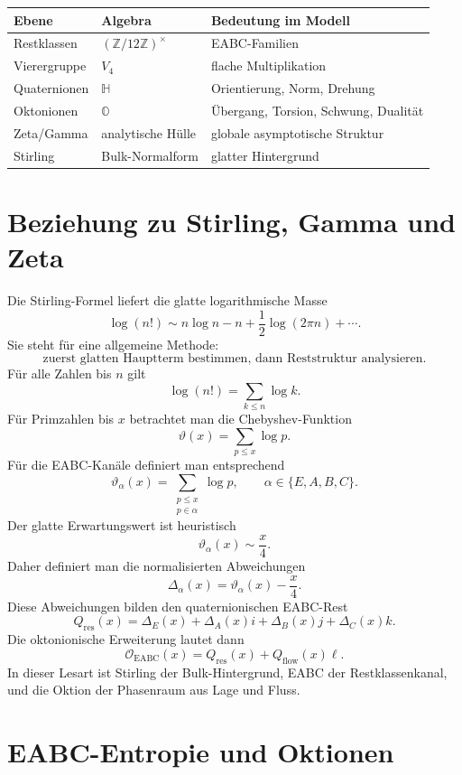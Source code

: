 \documentclass[11pt,a4paper]{article}
\theoremstyle{definition}
\theoremstyle{plain}
\newcommand{\Z}{\mathbb{Z}}
\newcommand{\HH}{\mathbb{H}}
\newcommand{\OO}{\mathbb{O}}
\newcommand{\EABC}{\mathrm{EABC}}
\begin{document}
	\begin{center}
		\begin{tabular}{lll}
			\toprule
			Ebene & Algebra & Bedeutung im Modell\\
			\midrule
			Restklassen & $(\Z/12\Z)^\times$ & EABC-Familien\\
			Vierergruppe & $V_4$ & flache Multiplikation\\
			Quaternionen & $\HH$ & Orientierung, Norm, Drehung\\
			Oktonionen & $\OO$ & Übergang, Torsion, Schwung, Dualität\\
			Zeta/Gamma & analytische Hülle & globale asymptotische Struktur\\
			Stirling & Bulk-Normalform & glatter Hintergrund\\
			\bottomrule
		\end{tabular}
	\end{center}
	
	\section{Beziehung zu Stirling, Gamma und Zeta}
	
	Die Stirling-Formel liefert die glatte logarithmische Masse
	\[
	\log(n!)
	\sim
	n\log n-n+\frac12\log(2\pi n)+\cdots.
	\]
	Sie steht für eine allgemeine Methode:
	\[
	\text{zuerst glatten Hauptterm bestimmen, dann Reststruktur analysieren.}
	\]
	Für alle Zahlen bis $n$ gilt
	\[
	\log(n!)=\sum_{k\le n}\log k.
	\]
	Für Primzahlen bis $x$ betrachtet man die Chebyshev-Funktion
	\[
	\vartheta(x)=\sum_{p\le x}\log p.
	\]
	Für die EABC-Kanäle definiert man entsprechend
	\[
	\vartheta_\alpha(x)
	=
	\sum_{\substack{p\le x\\ p\in\alpha}}\log p,
	\qquad
	\alpha\in\{E,A,B,C\}.
	\]
	Der glatte Erwartungswert ist heuristisch
	\[
	\vartheta_\alpha(x)\sim \frac{x}{4}.
	\]
	Daher definiert man die normalisierten Abweichungen
	\[
	\Delta_\alpha(x)=\vartheta_\alpha(x)-\frac{x}{4}.
	\]
	Diese Abweichungen bilden den quaternionischen EABC-Rest
	\[
	Q_{\mathrm{res}}(x)
	=
	\Delta_E(x)+\Delta_A(x)i+
	\Delta_B(x)j+
	\Delta_C(x)k.
	\]
	Die oktonionische Erweiterung lautet dann
	\[
	\mathcal O_{\EABC}(x)
	=
	Q_{\mathrm{res}}(x)+Q_{\mathrm{flow}}(x)\ell.
	\]
	In dieser Lesart ist Stirling der Bulk-Hintergrund, EABC der Restklassenkanal, und die Oktion der Phasenraum aus Lage und Fluss.
	
	\section{EABC-Entropie und Oktionen}
	
\end{document}
